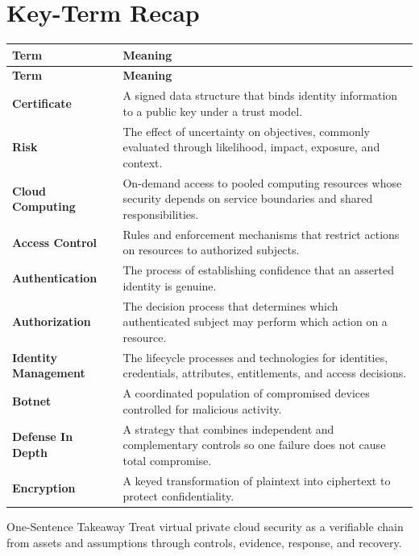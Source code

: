 \documentclass[11pt,letterpaper]{article}
\begin{document}
\section*{Key-Term Recap}
\begin{longtable}{>{\raggedright\arraybackslash}p{}>{\raggedright\arraybackslash}p{}}
\toprule\rowcolor{Navy}\color{white}\textbf{Term} & \color{white}\textbf{Meaning}\\\midrule
\endfirsthead
\toprule\rowcolor{Navy}\color{white}\textbf{Term} & \color{white}\textbf{Meaning}\\\midrule
\endhead
\textbf{Certificate} & A signed data structure that binds identity information to a public key under a trust model. \\\midrule
\textbf{Risk} & The effect of uncertainty on objectives, commonly evaluated through likelihood, impact, exposure, and context. \\\midrule
\textbf{Cloud Computing} & On-demand access to pooled computing resources whose security depends on service boundaries and shared responsibilities. \\\midrule
\textbf{Access Control} & Rules and enforcement mechanisms that restrict actions on resources to authorized subjects. \\\midrule
\textbf{Authentication} & The process of establishing confidence that an asserted identity is genuine. \\\midrule
\textbf{Authorization} & The decision process that determines which authenticated subject may perform which action on a resource. \\\midrule
\textbf{Identity Management} & The lifecycle processes and technologies for identities, credentials, attributes, entitlements, and access decisions. \\\midrule
\textbf{Botnet} & A coordinated population of compromised devices controlled for malicious activity. \\\midrule
\textbf{Defense In Depth} & A strategy that combines independent and complementary controls so one failure does not cause total compromise. \\\midrule
\textbf{Encryption} & A keyed transformation of plaintext into ciphertext to protect confidentiality. \\\midrule
\bottomrule
\end{longtable}
\begin{CornellExamBox}{One-Sentence Takeaway}
Treat virtual private cloud security as a verifiable chain from assets and assumptions through controls, evidence, response, and recovery.
\end{CornellExamBox}
\end{document}
